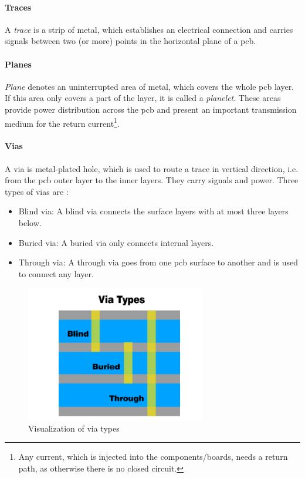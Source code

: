 \paragraph{Traces}
A \textit{trace} is a strip of metal, which establishes an electrical connection and carries signals between two (or more) points in the horizontal plane of a \gls{pcb}. \cite{xilDecouple}

\paragraph{Planes}
\textit{Plane} denotes an uninterrupted area of metal, which covers the whole \gls{pcb} layer. If this area only covers a part of the layer, it is called a \textit{planelet}. These areas provide power distribution across the \gls{pcb} and present an important transmission medium for the return current\footnote{Any current, which is injected into the components/boards, needs a return path, as otherwise there is no closed circuit.}. \cite{xilDecouple}

\paragraph{Vias}
A via is metal-plated hole, which is used to route a trace in vertical direction, i.e. from the \gls{pcb} outer layer to the inner layers. They carry signals and power. Three types of vias are \cite{vias}:
\begin{itemize}
	\item Blind via: A blind via connects the surface layers with at most three layers below.
	\item Buried via: A buried via only connects internal layers.
	\item Through via: A through via goes from one \gls{pcb} surface to another and is used to connect any layer. 
\end{itemize}
\begin{figure}[tbh]
	\centering
	\includegraphics[width = 0.7\textwidth]{chap/04-work/img/vias}
	\caption[Via types]{Visualization of via types \cite{vias}}
	\label{fig:vias}
\end{figure}


